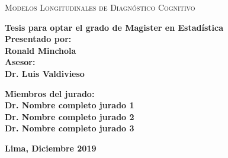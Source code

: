 \begin{titlepage}
\begin{center}
			\begin{spacing}{1.5}
				\textsc{{\LARGE Modelos Longitudinales de Diagnóstico Cognitivo}}
			\end{spacing}
			\vspace{1.2cm}
			\textbf{{\large Tesis para optar el grado de Magister en Estadística}}\\
			
			\vspace*{1.2cm}
			\textbf{{\large Presentado por:}}\\
			\vspace*{0.3cm}
			\textbf{{\large Ronald Minchola }}\\
			\vspace*{1.2cm}
			\textbf{{\large Asesor:}}\\
			\vspace*{0.3cm}
			\textbf{{\large Dr. Luis Valdivieso}}\\
			
			\vspace*{1.2cm}
			
			\textbf{\large Miembros del jurado:}\\
			\vspace{5mm}
			\textbf{\large 
					Dr. Nombre completo jurado 1\\
					Dr. Nombre completo jurado 2\\
					Dr. Nombre completo jurado 3}
			
			\vfill
			
			\textbf{Lima, Diciembre 2019}
		\end{center}
	
\end{titlepage}
